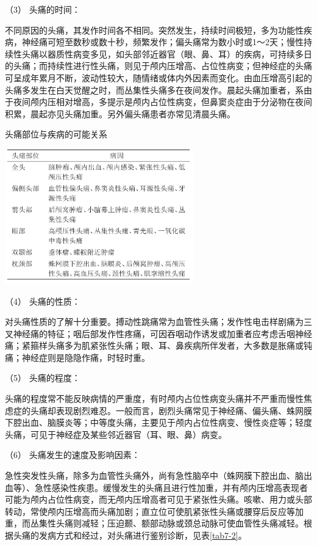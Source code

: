 \hypertarget{text00020.htmlux5cux23CHP1-7-2-1-1-3}{}
（3） 头痛的时间：

不同原因的头痛，其发作时间各不相同。突然发生，持续时间极短，多为功能性疾病，神经痛可短至数秒或数十秒，频繁发作；偏头痛常为数小时或1～2天；慢性持续性头痛以器质性病变多见，如头部邻近器官（眼、鼻、耳）的疾病，可持续多日的头痛；而持续性进行性头痛，则见于颅内压增高、占位性病变；但神经症的头痛可呈成年累月不断，波动性较大，随情绪或体内外因素而变化。由血压增高引起的头痛多发生在白天觉醒之时，而丛集性头痛多在夜间发作。晨起头痛加重者，系由于夜间颅内压相对增高，多提示是颅内占位性病变，但鼻窦炎症由于分泌物在夜间积累，晨起亦见头痛加重。另外偏头痛患者亦常见清晨头痛。

\begin{table}[htbp]
\centering
\caption{头痛部位与疾病的可能关系}
\label{tab7-1}
\includegraphics[width=3.21875in,height=2.30208in]{./images/Image00039.jpg}
\end{table}

\hypertarget{text00020.htmlux5cux23CHP1-7-2-1-1-4}{}
（4） 头痛的性质：

对头痛性质的了解十分重要。搏动性跳痛常为血管性头痛；发作性电击样剧痛为三叉神经痛的特征；咽后部发作性疼痛，可因吞咽动作诱发或加重者应考虑舌咽神经痛；紧箍样头痛多为肌紧张性头痛；眼、耳、鼻疾病所伴发者，大多数是胀痛或钝痛；神经症则是隐隐作痛，时轻时重。

\hypertarget{text00020.htmlux5cux23CHP1-7-2-1-1-5}{}
（5） 头痛的程度：

头痛的程度常不能反映病情的严重度，有时颅内占位性病变头痛并不严重而慢性焦虑症的头痛却表现剧烈难忍。一般而言，剧烈头痛常见于神经痛、偏头痛、蛛网膜下腔出血、脑膜炎等；中等度头痛，主要见于颅内占位性病变、慢性炎症等；轻度头痛，可见于神经症及某些邻近器官（耳、眼、鼻）病变。

\hypertarget{text00020.htmlux5cux23CHP1-7-2-1-1-6}{}
（6） 头痛发生的速度及影响因素：

急性突发性头痛，除多为血管性头痛外，尚有急性脑卒中（蛛网膜下腔出血、脑出血等）、急性感染性疾患。缓慢发生的头痛且进行性加重，并有颅内压增高表现者可能为颅内占位性病变，而无颅内压增高者可见于紧张性头痛。咳嗽、用力或头部转动，常使颅内压增高而头痛加剧；直立位可使肌紧张性头痛或腰穿后反应等加重，而丛集性头痛则减轻；压迫颞、额部动脉或颈总动脉可使血管性头痛减轻。根据头痛的发病方式和经过，对头痛进行鉴别诊断，见表\ref{tab7-2}。

